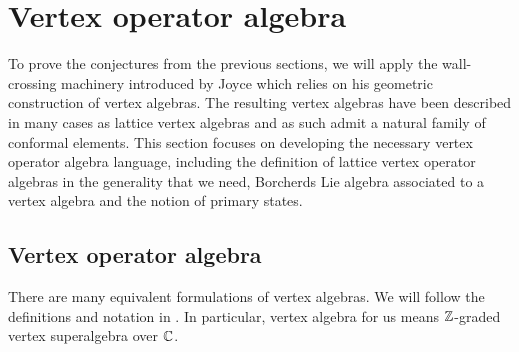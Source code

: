 \documentclass[a4paper, 12pt]{amsart}
\begin{document}
\section{Vertex operator algebra}

To prove the conjectures from the previous sections, we will apply the wall-crossing machinery introduced by Joyce which relies on his geometric construction of vertex algebras. The resulting vertex algebras have been described in many cases as lattice vertex algebras and as such admit a natural family of conformal elements. This section focuses on developing the necessary vertex operator algebra language, including the definition of lattice vertex operator algebras in the generality that we need, Borcherds Lie algebra associated to a vertex algebra and the notion of primary states.

\subsection{Vertex operator algebra}
\label{sec: voadefinition}
 There are many equivalent formulations of vertex algebras. We will follow the definitions and notation in \cite{Ka98}. In particular, vertex algebra for us means ${\mathbb{Z}}$-graded vertex superalgebra over ${\mathbb{C}}$.
 
\end{document}
